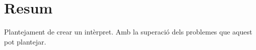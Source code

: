 \section*{Resum}
Plantejament de crear un intèrpret.
Amb la superació dels problemes que aquest pot plantejar.